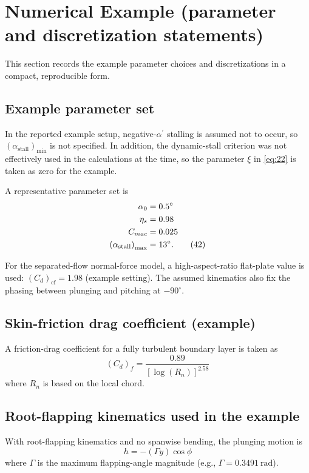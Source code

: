 \documentclass[11pt,a4paper]{article}
\begin{document}
\section{Numerical Example (parameter and discretization statements)}
This section records the example parameter choices and discretizations in a compact, reproducible form.

\subsection{Example parameter set}
In the reported example setup, negative-$\alpha^\prime$ stalling is assumed not to occur,
so $(\alpha_{\text{stall}})_{\min}$ is not specified. In addition, the dynamic-stall criterion
was not effectively used in the calculations at the time, so the parameter $\xi$ in \eqref{eq:22}
is taken as zero for the example.

A representative parameter set is
\begin{align}
\alpha_0&=0.5^\circ\notag\\
\eta_s&=0.98\notag\\
C_{mac}&=0.025\notag\\
\left(\alpha_{\text{stall}}\right)_{\max}&=13^\circ.
\tag{42}\label{eq:42}
\end{align}

For the separated-flow normal-force model, a high-aspect-ratio flat-plate value is used:
$(C_d)_{\text{cf}}=1.98$ (example setting). The assumed kinematics also fix the phasing between
plunging and pitching at $-90^\circ$.

\subsection{Skin-friction drag coefficient (example)}
A friction-drag coefficient for a fully turbulent boundary layer is taken as
\begin{equation}
\left(C_d\right)_f=\frac{0.89}{\left[\log(R_n)\right]^{2.58}}
\tag{43}\label{eq:43}
\end{equation}
where $R_n$ is based on the local chord.

\subsection{Root-flapping kinematics used in the example}
With root-flapping kinematics and no spanwise bending, the plunging motion is
\begin{equation}
h=-(\Gamma y)\cos\phi
\tag{44}\label{eq:44}
\end{equation}
where $\Gamma$ is the maximum flapping-angle magnitude (e.g., $\Gamma=0.3491~\text{rad}$).
\end{document}
